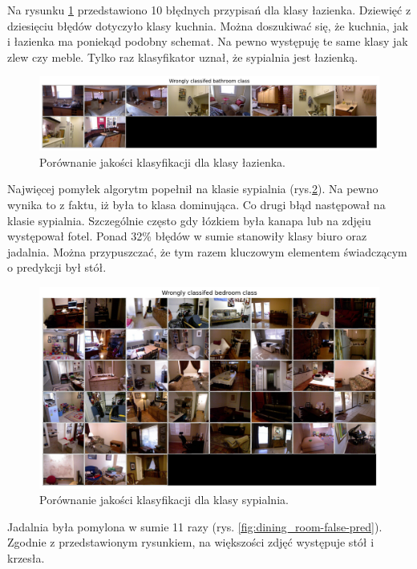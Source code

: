 Na rysunku \ref{fig:bathroom-false-pred} przedstawiono 10 błędnych przypisań dla klasy łazienka. Dziewięć z dziesięciu błędów dotyczyło klasy kuchnia. Można doszukiwać się, że kuchnia, jak i łazienka ma poniekąd podobny schemat. Na pewno występuję te same klasy jak zlew czy meble. Tylko raz klasyfikator uznał, że sypialnia jest łazienką.
\begin{figure}[ht!]
    \centering
    \includegraphics[width=\textwidth]{img/preds_analysis/classification/bathroom.png}
    \caption{Porównanie jakości klasyfikacji dla klasy łazienka.}
    \label{fig:bathroom-false-pred}
\end{figure}
Najwięcej pomyłek algorytm popełnił na klasie sypialnia (rys.\ref{fig:bedroom-false-pred}). Na pewno wynika to z faktu, iż była to klasa dominująca. Co drugi błąd następował na klasie sypialnia. Szczególnie często gdy łózkiem była kanapa lub na zdjęiu występował fotel. Ponad 32\% błędów w sumie stanowiły klasy biuro oraz jadalnia. Można przypuszczać, że tym razem kluczowym elementem świadczącym o predykcji był stół.
\begin{figure}[ht!]
    \centering
    \includegraphics[width=\textwidth]{img/preds_analysis/classification/bedroom.png}
    \caption{Porównanie jakości klasyfikacji dla klasy sypialnia.}
    \label{fig:bedroom-false-pred}
\end{figure}
Jadalnia była pomylona w sumie 11 razy (rys. \ref{fig:dining_room-false-pred}). Zgodnie z przedstawionym rysunkiem, na większości zdjęć występuje stół i krzesła.

